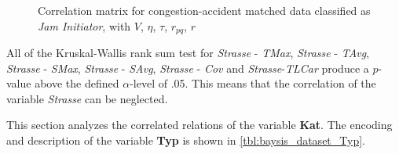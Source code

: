 \begin{figure}[!ht]
	\centering
	\caption{Correlation matrix for congestion-accident matched data classified as \textit{Jam Initiator}, with $V$, $\eta$, $\tau$, $r_{pq}$, $r$}
	\label{img:correlation_matrix_selected_initiator_cramers}
\end{figure}

All of the Kruskal-Wallis rank sum test for \textit{Strasse} - \textit{TMax}, \textit{Strasse} - \textit{TAvg}, \textit{Strasse} - \textit{SMax}, \textit{Strasse} - \textit{SAvg}, \textit{Strasse} - \textit{Cov} and \textit{Strasse}-\textit{TLCar} produce a $p$-value above the defined $\alpha$-level of .05. This means that the correlation of the variable \textit{Strasse} can be neglected.

This section analyzes the correlated relations of the variable \textbf{Kat}. The encoding and description of the variable \textbf{Typ} is shown in \cref{tbl:baysis_dataset_Typ}.
